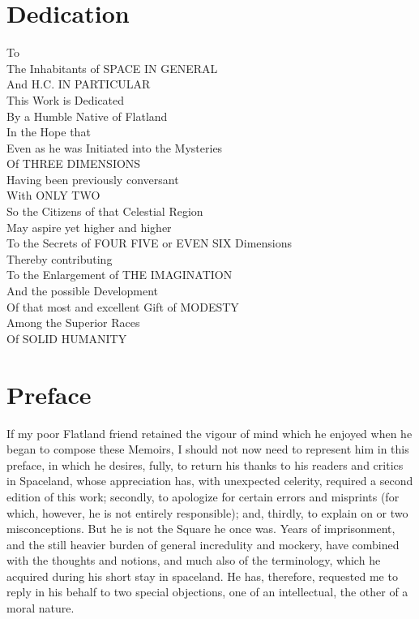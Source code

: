 \documentclass[12pt, a4paper, twoside]{memoir}
\begin{document}
\chapter*{Dedication}

\begin{center}
To\\
The Inhabitants of SPACE IN GENERAL\\
And H.C. IN PARTICULAR\\
This Work is Dedicated\\
By a Humble Native of Flatland\\
In the Hope that\\
Even as he was Initiated into the Mysteries\\
Of THREE DIMENSIONS\\
Having been previously conversant\\
With ONLY TWO\\
So the Citizens of that Celestial Region\\
May aspire yet higher and higher\\
To the Secrets of FOUR FIVE or EVEN SIX Dimensions\\
Thereby contributing\\
To the Enlargement of THE IMAGINATION\\
And the possible Development\\
Of that most and excellent Gift of MODESTY\\
Among the Superior Races\\
Of SOLID HUMANITY\\
\end{center}


\chapter*{Preface}
If my poor Flatland friend retained the vigour of mind which he enjoyed when
he began to compose these Memoirs, I should not now need to represent him in
this preface, in which he desires, fully, to return his thanks to his readers
and critics in Spaceland, whose appreciation has, with unexpected celerity,
required a second edition of this work; secondly, to apologize for certain
errors and misprints (for which, however, he is not entirely responsible);
and, thirdly, to explain on or two misconceptions. But he is not the Square he
once was. Years of imprisonment, and the still heavier burden of general
incredulity and mockery, have combined with the thoughts and notions, and much
also of the terminology, which he acquired during his short stay in spaceland.
He has, therefore, requested me to reply in his behalf to two special
objections, one of an intellectual, the other of a moral nature.
\end{document}
